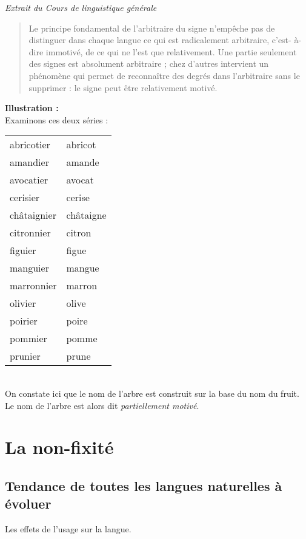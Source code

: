 \emph{Extrait du \textit{Cours de linguistique générale}}
\begin{quote}
      Le principe fondamental de
l’arbitraire du signe n’empêche pas
de distinguer dans chaque langue ce
qui est radicalement arbitraire, c’est-
à-dire immotivé, de ce qui ne l’est
que relativement. Une partie
seulement des signes est absolument
arbitraire ; chez d’autres intervient
un phénomène qui permet de
reconnaître des degrés dans
l’arbitraire sans le supprimer : le
signe peut être relativement
motivé.
\end{quote}

\textbf{Illustration :}\\
Examinons ces deux séries :\\
\begin{tabular}{|l l}
   abricotier & abricot\\
   amandier & amande\\
   avocatier & avocat\\
   cerisier & cerise\\
   châtaignier & châtaigne\\
   citronnier & citron\\
   figuier & figue\\
   manguier & mangue\\
   marronnier & marron\\
   olivier & olive\\
   poirier & poire\\
   pommier & pomme\\
   prunier & prune\\
\end{tabular}
\\

On constate ici que le nom de l'arbre est construit sur la base du nom du fruit.\\
Le nom de l'arbre est alors dit \emph{partiellement motivé}.

\section{La non-fixité}
\subsection{Tendance de toutes les langues naturelles à évoluer}
Les effets de l'usage sur la langue.\\

